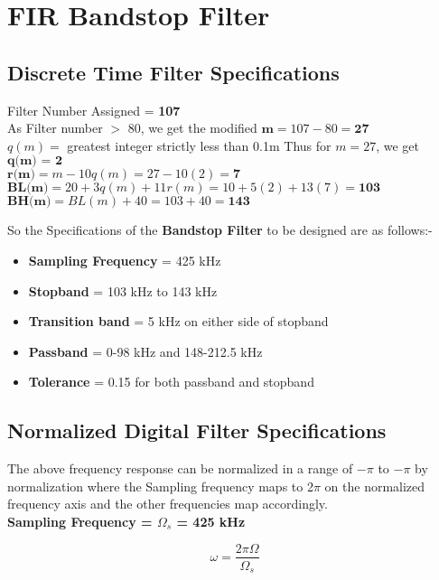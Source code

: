 \documentclass[12pt]{article}
\begin{document}
\section{FIR Bandstop Filter}
\subsection{Discrete Time Filter Specifications}

Filter Number Assigned = \textbf{107}\\
As Filter number $>$ 80, we get the modified $\textbf{m} = 107 - 80 = \textbf{27}$\\
$q(m) =$ greatest integer strictly less than 0.1m
Thus for $m = 27$, we get $\textbf{q(m) = 2}$\\
$\textbf{r(m)} = m - 10q(m) = 27 - 10(2) = \textbf{7}$\\
$\textbf{BL(m)} = 20 + 3q(m) + 11r(m) = 10 + 5(2) + 13(7) = \textbf{103}$\\
$\textbf{BH(m)} = BL(m) + 40 = 103 + 40 = \textbf{143}$\\
\par

\noindent So the Specifications of the \textbf{Bandstop Filter} to be designed are as follows:-

\begin{itemize}
    \item \textbf{Sampling Frequency} = 425 kHz
    \item \textbf{Stopband} = 103 kHz to 143 kHz
    \item \textbf{Transition band} = 5 kHz on either side of stopband
    \item \textbf{Passband} = 0-98 kHz and 148-212.5 kHz
    \item \textbf{Tolerance} = 0.15 for both passband and stopband
\end{itemize}

\subsection{Normalized Digital Filter Specifications}
The above frequency response can be normalized in a range of $-\pi$ to $-\pi$ by normalization where the Sampling frequency maps to 2$\pi$ on the normalized frequency axis and the other frequencies map accordingly.\\
\textbf{Sampling Frequency = $\Omega_{s}$ = 425 kHz}

\[\omega = \frac{2\pi\Omega}{\Omega_{s}}\]
\end{document}
